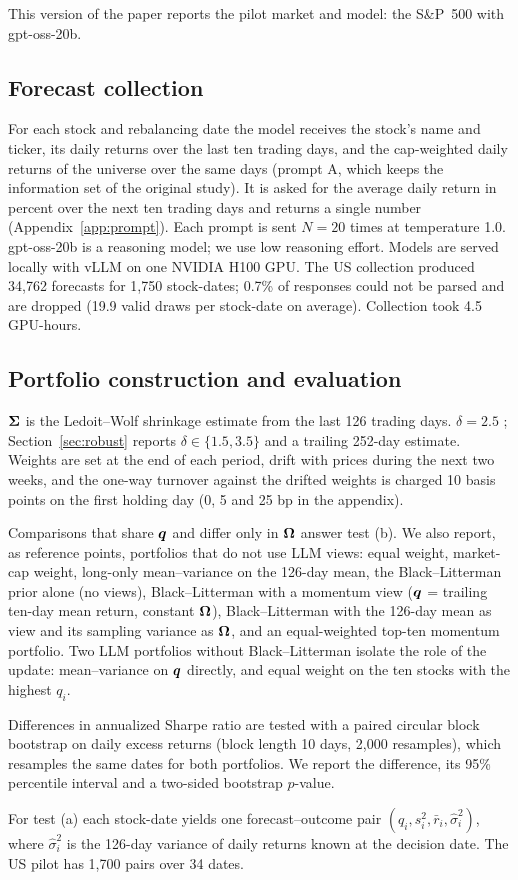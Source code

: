 This version of the paper reports the pilot market and model: the S\&P~500 with gpt-oss-20b. 

\subsection{Forecast collection}
For each stock and rebalancing date the model receives the stock's name and ticker, its daily returns over the last ten trading days, and the cap-weighted daily returns of the universe over the same days (prompt A, which keeps the information set of the original study). It is asked for the average daily return in percent over the next ten trading days and returns a single number (Appendix~\ref{app:prompt}). Each prompt is sent $N=20$ times at temperature 1.0. gpt-oss-20b is a reasoning model; we use low reasoning effort. Models are served locally with vLLM \citep{kwon2023efficient} on one NVIDIA H100 GPU. The US collection produced 34{,}762 forecasts for 1{,}750 stock-dates; 0.7\% of responses could not be parsed and are dropped (19.9 valid draws per stock-date on average). Collection took 4.5 GPU-hours.

\subsection{Portfolio construction and evaluation}
$\bm{\Sigma}$ is the Ledoit--Wolf shrinkage estimate \citep{ledoit2004well} from the last 126 trading days. $\delta = 2.5$ \citep{he2002intuition}; Section~\ref{sec:robust} reports $\delta \in \{1.5, 3.5\}$ and a trailing 252-day estimate. Weights are set at the end of each period, drift with prices during the next two weeks, and the one-way turnover against the drifted weights is charged 10 basis points on the first holding day (0, 5 and 25 bp in the appendix).

Comparisons that share $\bm{q}$ and differ only in $\bm{\Omega}$ answer test (b). We also report, as reference points, portfolios that do not use LLM views: equal weight, market-cap weight, long-only mean--variance on the 126-day mean, the Black--Litterman prior alone (no views), Black--Litterman with a momentum view ($\bm{q}$ = trailing ten-day mean return, constant $\bm{\Omega}$), Black--Litterman with the 126-day mean as view and its sampling variance as $\bm{\Omega}$, and an equal-weighted top-ten momentum portfolio. Two LLM portfolios without Black--Litterman isolate the role of the update: mean--variance on $\bm{q}$ directly, and equal weight on the ten stocks with the highest $q_i$.

Differences in annualized Sharpe ratio are tested with a paired circular block bootstrap \citep{politis1992circular,ledoit2008robust} on daily excess returns (block length 10 days, 2{,}000 resamples), which resamples the same dates for both portfolios. We report the difference, its 95\% percentile interval and a two-sided bootstrap $p$-value.

For test (a) each stock-date yields one forecast--outcome pair $(q_i, s_i^2, \bar r_i, \hat\sigma_i^2)$, where $\hat\sigma_i^2$ is the 126-day variance of daily returns known at the decision date. The US pilot has 1{,}700 pairs over 34 dates.
